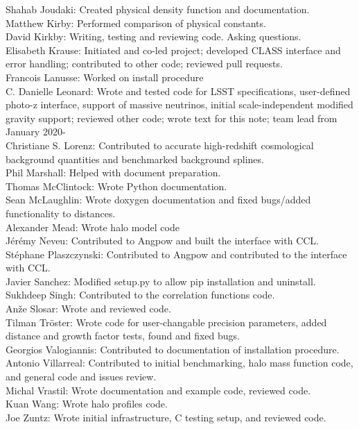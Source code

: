 Shahab Joudaki: Created physical density function and documentation. \\
Matthew Kirby: Performed comparison of physical constants. \\
David Kirkby: Writing, testing and reviewing code. Asking questions. \\
Elisabeth Krause: Initiated and co-led project; developed CLASS interface and error handling; contributed to other code; reviewed pull requests. \\
Francois Lanusse: Worked on install procedure \\
C. Danielle Leonard: Wrote and tested code for LSST specifications, user-defined photo-z interface, support of massive neutrinos, initial scale-independent modified gravity support; reviewed other code; wrote text for this note; team lead from January 2020- \\
Christiane S. Lorenz: Contributed to accurate high-redshift cosmological background quantities and benchmarked background splines. \\
Phil Marshall: Helped with document preparation. \\
Thomas McClintock: Wrote Python documentation. \\
Sean McLaughlin: Wrote doxygen documentation and fixed bugs/added functionality to distances. \\
Alexander Mead: Wrote halo model code \\
J\'er\'emy Neveu: Contributed to Angpow and built the interface with CCL. \\
St\'ephane Plaszczynski: Contributed to Angpow and contributed to the interface with CCL. \\
Javier Sanchez: Modified setup.py to allow pip installation and uninstall. \\
Sukhdeep Singh: Contributed to the correlation functions code. \\
An\v{z}e Slosar: Wrote and reviewed code. \\
Tilman Tr\"oster: Wrote code for user-changable precision parameters, added distance and growth factor tests, found and fixed bugs. \\
Georgios Valogiannis: Contributed to documentation of installation procedure. \\
Antonio Villarreal: Contributed to initial benchmarking, halo mass function code, and general code and issues review. \\
Michal Vrastil: Wrote documentation and example code, reviewed code. \\
Kuan Wang: Wrote halo profiles code. \\
Joe Zuntz: Wrote initial infrastructure, C testing setup, and reviewed code. \\
